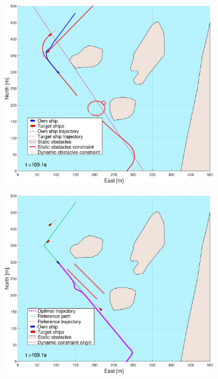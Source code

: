 \begin{figure}[!ht]
\begin{subfigure}[b]{0.494\textwidth}
        \subcaption{}
    \end{subfigure}
    \hfill
    \\
    \begin{subfigure}[b]{0.494\textwidth}
        \centering
        \includegraphics[width=\textwidth]{Images/NewFigures/Helloya_Rev/_Simple_1fig1_time=110}
        \subcaption{}
    \end{subfigure}
    \hfill
    \begin{subfigure}[b]{0.494\textwidth}
        \centering
        \includegraphics[width=\textwidth]{Images/NewFigures/Helloya_Rev/_Simple_1fig999_time=110}
        \subcaption{}
    \end{subfigure}
    \hfill
    \label{FIG: Helloya rev Simple pred}
\end{figure}%

